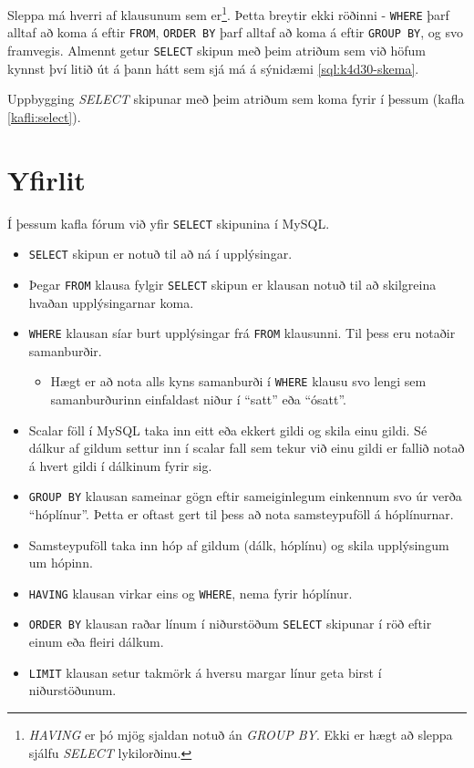 Sleppa má hverri af klausunum sem er\footnote{\emph{HAVING} er þó mjög sjaldan notuð án \emph{GROUP BY}. Ekki er hægt að sleppa sjálfu \emph{SELECT} lykilorðinu.}. Þetta breytir ekki röðinni - \verb|WHERE| þarf alltaf að koma á eftir \verb|FROM|, \verb|ORDER BY| þarf alltaf að koma á eftir \verb|GROUP BY|, og svo framvegis. Almennt getur \verb|SELECT| skipun með þeim atriðum sem við höfum kynnst því litið út á þann hátt sem sjá má á sýnidæmi \ref{sql:k4d30-skema}.

\begin{example}
\caption[Uppbygging]{Uppbygging \emph{SELECT} skipunar með þeim atriðum sem koma fyrir í þessum (kafla \ref{kafli:select}).}
\label{sql:k4d30-skema}
\centering
{}
\end{example}

\newpage
\section{Yfirlit}
Í þessum kafla fórum við yfir \verb|SELECT| skipunina í MySQL.
\begin{itemize}
 \item \verb|SELECT| skipun er notuð til að ná í upplýsingar.
 \item Þegar \verb|FROM| klausa fylgir \verb|SELECT| skipun er klausan notuð til að skilgreina hvaðan upplýsingarnar koma. 
 \item \verb|WHERE| klausan síar burt upplýsingar frá \verb|FROM| klausunni. Til þess eru notaðir samanburðir.
 \begin{itemize}
  \item Hægt er að nota alls kyns samanburði í \verb|WHERE| klausu svo lengi sem samanburðurinn einfaldast niður í ``satt'' eða ``ósatt''.
 \end{itemize}
 \item Scalar föll í MySQL taka inn eitt eða ekkert gildi og skila einu gildi. Sé dálkur af gildum settur inn í scalar fall sem tekur við einu gildi er fallið notað á hvert gildi í dálkinum fyrir sig.
 \item \verb|GROUP BY| klausan sameinar gögn eftir sameiginlegum einkennum svo úr verða ``hóplínur''. Þetta er oftast gert til þess að nota samsteypuföll á hóplínurnar.
 \item Samsteypuföll taka inn hóp af gildum (dálk, hóplínu) og skila upplýsingum um hópinn.
 \item \verb|HAVING| klausan virkar eins og \verb|WHERE|, nema fyrir hóplínur.
 \item \verb|ORDER BY| klausan raðar línum í niðurstöðum \verb|SELECT| skipunar í röð eftir einum eða fleiri dálkum.
 \item \verb|LIMIT| klausan setur takmörk á hversu margar línur geta birst í niðurstöðunum.
\end{itemize}
